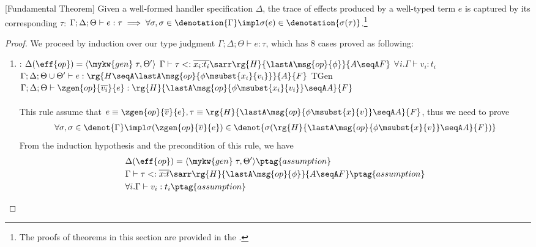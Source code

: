 \begin{theorem}\label{theorem:fundamental-ap}[Fundamental Theorem] Given
  a well-formed handler specification $\Delta$,
    the trace of effects produced by a well-typed term
    $e$ is captured by its corresponding \PAT $\tau$:
  $\Gamma; \Delta; \Theta \vdash e : \tau \implies \forall \sigma, \sigma \in
    \denotation{\Gamma} \impl \sigma(e) \in
    \denotation{\sigma(\tau)}$.\footnote{The proofs of theorems in this section are provided in the \techreport{}.}
\end{theorem}
\begin{proof} We proceed by induction over our type judgment $\Gamma;\Delta;\Theta \vdash e : \tau$, which has $8$ cases proved as following:
\begin{enumerate}[label=Case]

\item:
{\footnotesize
\mprooftr{87mm}
{
$\Delta(\eff{op}) =\langle \mykw{gen}\;\tau, \Theta' \rangle$ \quad
$\Gamma \vdash \tau <: \overline{x_i{:}t_i}\sarr
\rg{H}{\lastA\msg{op}{\phi}}{A \seqA F}$ \quad
$\forall i. \Gamma \vdash v_i : t_i$ \quad
 $\Gamma; \Delta; \Theta \cup \Theta' \vdash e : \rg{H \seqA \lastA\msg{op}{\phi\msubst{x_i}{v_i}}}{A}{F}$
 }
{TGen}
{$\Gamma; \Delta; \Theta \vdash \zgen{op}{\overline{v_i}}{e} : \rg{H}{\lastA\msg{op}{\phi\msubst{x_i}{v_i}} \seqA A}{F}$}
\ \\ \ \\}
This rule assume that $e \equiv \zgen{op}{\overline{v}}{e}, \tau \equiv \rg{H}{\lastA\msg{op}{\phi\msubst{x}{v}} \seqA A}{F}$, thus we need to prove
{\footnotesize\begin{align*}
    \forall \sigma, \sigma \in \denot{\Gamma} \impl \sigma(\zgen{op}{\overline{v}}{e}) \in \denot{\sigma(\rg{H}{\lastA\msg{op}{\phi\msubst{x}{v}} \seqA A}{F})}
\end{align*}}\noindent
From the induction hypothesis and the precondition of this rule, we have
{\footnotesize\begin{alignat}{2}
\setcounter{equation}{0}
&\Delta(\eff{op}) =\langle \mykw{gen}\;\tau, \Theta' \rangle \ptag{assumption} \label{found:1-1} \\
&\Gamma \vdash \tau <: \overline{x{:}t}\sarr \rg{H}{\lastA\msg{op}{\phi}}{A \seqA F} \ptag{assumption} \label{found:1-2} \\
&\forall i. \Gamma \vdash v_i : t_i \ptag{assumption} \label{found:1-3} \\

\end{alignat}}
\end{enumerate}
\end{proof}
